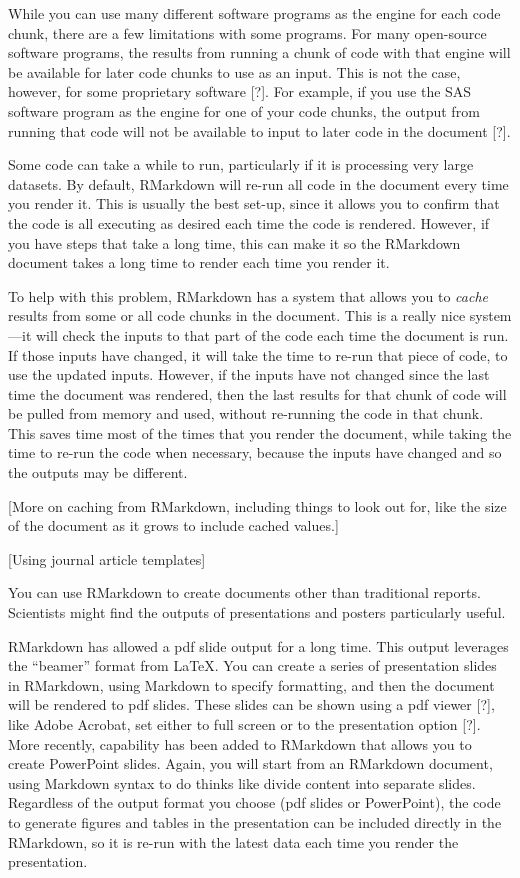 \documentclass[]{tufte-book}
\begin{document}
While you can use many different software programs as the engine for each code
chunk, there are a few limitations with some programs. For many open-source
software programs, the results from running a chunk of code with that engine
will be available for later code chunks to use as an input. This is not the case,
however, for some proprietary software {[}?{]}. For example, if you use the SAS software
program as the engine for one of your code chunks, the output from running that code
will not be available to input to later code in the document {[}?{]}.

Some code can take a while to run, particularly if it is processing very large
datasets. By default, RMarkdown will re-run all code in the document every time
you render it. This is usually the best set-up, since it allows you to confirm
that the code is all executing as desired each time the code is rendered.
However, if you have steps that take a long time, this can make it so the
RMarkdown document takes a long time to render each time you render it.

To help with this problem, RMarkdown has a system that allows you to \emph{cache}
results from some or all code chunks in the document. This is a really nice
system---it will check the inputs to that part of the code each time the
document is run. If those inputs have changed, it will take the time to re-run
that piece of code, to use the updated inputs. However, if the inputs have not
changed since the last time the document was rendered, then the last results for
that chunk of code will be pulled from memory and used, without re-running the
code in that chunk. This saves time most of the times that you render the
document, while taking the time to re-run the code when necessary, because the
inputs have changed and so the outputs may be different.

{[}More on caching from RMarkdown, including things to look out for, like the size
of the document as it grows to include cached values.{]}

{[}Using journal article templates{]}

You can use RMarkdown to create documents other than traditional reports.
Scientists might find the outputs of presentations and posters particularly
useful.

RMarkdown has allowed a pdf slide output for a long time. This output leverages
the ``beamer'' format from LaTeX. You can create a series of presentation slides
in RMarkdown, using Markdown to specify formatting, and then the document will
be rendered to pdf slides. These slides can be shown using a pdf viewer {[}?{]},
like Adobe Acrobat, set either to full screen or to the presentation option {[}?{]}.
More recently, capability has been added to RMarkdown that allows you to create
PowerPoint slides. Again, you will start from an RMarkdown document, using
Markdown syntax to do thinks like divide content into separate slides.
Regardless of the output format you choose (pdf slides or PowerPoint), the code
to generate figures and tables in the presentation can be included directly in
the RMarkdown, so it is re-run with the latest data each time you render the
presentation.
\end{document}
